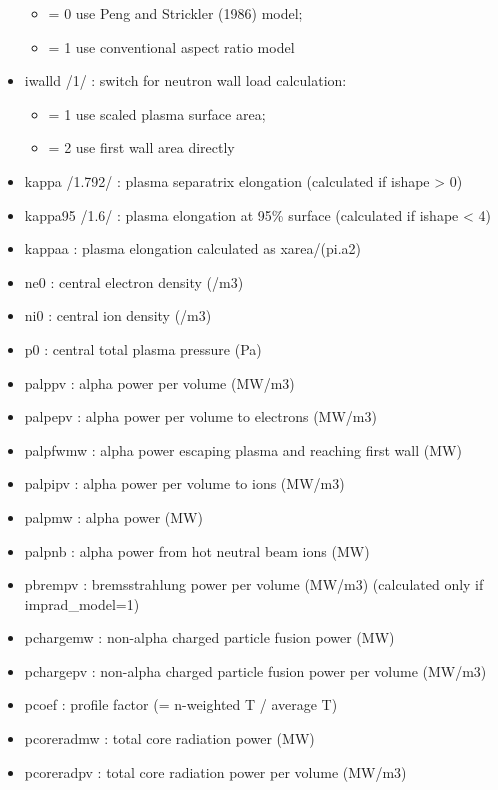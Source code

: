 \documentclass[]{article}
\providecommand{\tightlist}{%
  \setlength{\itemsep}{0pt}\setlength{\parskip}{0pt}}
\begin{document}
\begin{itemize}
  \begin{itemize}
  \tightlist
  \item
    = 0 use Peng and Strickler (1986) model;
  \item
    = 1 use conventional aspect ratio model
  \end{itemize}
\item
  iwalld /1/ : switch for neutron wall load calculation:

  \begin{itemize}
  \tightlist
  \item
    = 1 use scaled plasma surface area;
  \item
    = 2 use first wall area directly
  \end{itemize}
\item
  kappa /1.792/ : plasma separatrix elongation (calculated if ishape
  \textgreater{} 0)
\item
  kappa95 /1.6/ : plasma elongation at 95\% surface (calculated if
  ishape \textless{} 4)
\item
  kappaa : plasma elongation calculated as xarea/(pi.a2)
\item
  ne0 : central electron density (/m3)
\item
  ni0 : central ion density (/m3)
\item
  p0 : central total plasma pressure (Pa)
\item
  palppv : alpha power per volume (MW/m3)
\item
  palpepv : alpha power per volume to electrons (MW/m3)
\item
  palpfwmw : alpha power escaping plasma and reaching first wall (MW)
\item
  palpipv : alpha power per volume to ions (MW/m3)
\item
  palpmw : alpha power (MW)
\item
  palpnb : alpha power from hot neutral beam ions (MW)
\item
  pbrempv : bremsstrahlung power per volume (MW/m3) (calculated only if
  imprad\_model=1)
\item
  pchargemw : non-alpha charged particle fusion power (MW)
\item
  pchargepv : non-alpha charged particle fusion power per volume (MW/m3)
\item
  pcoef : profile factor (= n-weighted T / average T)
\item
  pcoreradmw : total core radiation power (MW)
\item
  pcoreradpv : total core radiation power per volume (MW/m3)

\end{itemize}
\end{document}
